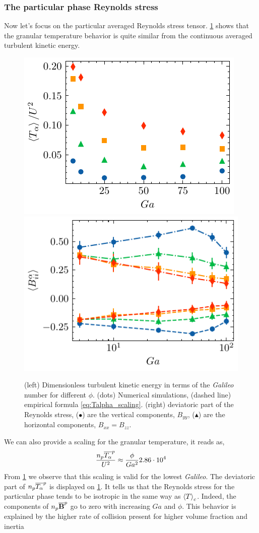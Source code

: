 \subsubsection{The particular phase Reynolds stress}
Now let's focus on the particular averaged Reynolds stress tensor.
\ref{fig:Talpha_Balpha} shows that the granular temperature behavior is quite similar from the continuous averaged turbulent kinetic energy.
\begin{figure}[h!]
    \centering
    \includegraphics[height=0.3\textwidth]{image/HOMOGENEOUS/fPA/Talpha.pdf}
    \includegraphics[height=0.3\textwidth]{image/HOMOGENEOUS/fPA/Balpha.pdf}
    \caption{(left) Dimensionless turbulent kinetic energy in terms of the \textit{Galileo} number for different $\phi$. (dots) Numerical simulations, (dashed line) empirical formula \ref{eq:Talpha_scaling}.
    (right) deviatoric part of the Reynolds stress, ($\bullet$) are the vertical components, $B_{yy}$, ($\blacktriangle$) are the horizontal components, $B_{xx} = B_{zz}$.}
    \label{fig:Talpha_Balpha}
\end{figure}
We can also provide a scaling for the granular temperature, it reads as,  
\begin{equation}
    \frac{n_p\overline{T_\alpha}^{p}}{U^2}  \approx \frac{\phi}{Ga^2} 2.86\cdot10^{4} 
    \label{eq:Talpha_scaling}
\end{equation}
From \ref{fig:Talpha_Balpha} we observe that this scaling is valid for the lowest \textit{Galileo}. 
The deviatoric part of $n_p\overline{T_\alpha}^{p}$ is displayed on \ref{fig:Talpha_Balpha}.
It tells us that the Reynolds stress for the particular phase tends to be isotropic in the same way as $\left<T\right>_c$. 
Indeed, the components of $n_p\overline{\textbf{B}}^{p}$ go to zero with increasing $Ga$ and $\phi$. 
This behavior is explained by the higher rate of collision present for higher volume fraction and inertia \citep[chapter 1]{jackson2000dynamics}